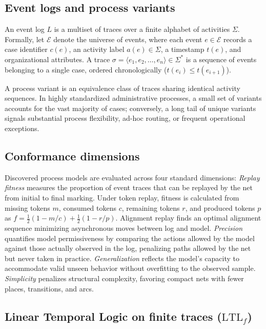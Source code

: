 \documentclass[12pt,a4paper]{article}
\begin{document}
\subsection{Event logs and process variants}

An event log $L$ is a multiset of traces over a finite alphabet of activities $\Sigma$. Formally, let $\mathcal{E}$ denote the universe of events, where each event $e \in \mathcal{E}$ records a case identifier $c(e)$, an activity label $a(e) \in \Sigma$, a timestamp $t(e)$, and organizational attributes. A trace $\sigma = \langle e_1, e_2, \dots, e_n \rangle \in \Sigma^*$ is a sequence of events belonging to a single case, ordered chronologically ($t(e_i) \le t(e_{i+1})$). 

A process variant is an equivalence class of traces sharing identical activity sequences. In highly standardized administrative processes, a small set of variants accounts for the vast majority of cases; conversely, a long tail of unique variants signals substantial process flexibility, ad-hoc routing, or frequent operational exceptions.

\subsection{Conformance dimensions}

Discovered process models are evaluated across four standard dimensions:
\emph{Replay fitness} measures the proportion of event traces that can be replayed by the net from initial to final marking. Under token replay, fitness is calculated from missing tokens $m$, consumed tokens $c$, remaining tokens $r$, and produced tokens $p$ as $f = \frac{1}{2}(1 - m/c) + \frac{1}{2}(1 - r/p)$. Alignment replay finds an optimal alignment sequence minimizing asynchronous moves between log and model.
\emph{Precision} quantifies model permissiveness by comparing the actions allowed by the model against those actually observed in the log, penalizing paths allowed by the net but never taken in practice.
\emph{Generalization} reflects the model's capacity to accommodate valid unseen behavior without overfitting to the observed sample.
\emph{Simplicity} penalizes structural complexity, favoring compact nets with fewer places, transitions, and arcs.

\subsection{Linear Temporal Logic on finite traces (\texorpdfstring{$\text{LTL}_f$}{LTLf})}
\end{document}

